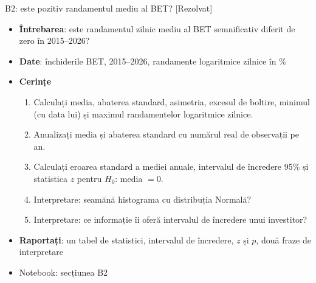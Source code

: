 \begin{frame}{B2: este pozitiv randamentul mediu al BET? [Rezolvat]}
\itemsize{\footnotesize}
\begin{itemize}
\item \textbf{Întrebarea}: este randamentul zilnic mediu al BET semnificativ diferit de zero în 2015--2026?
\item \textbf{Date}: închiderile BET, 2015--2026, randamente logaritmice zilnice în \%
\item \textbf{Cerințe}
\begin{enumerate}
    \item Calculați media, abaterea standard, asimetria, excesul de boltire, minimul (cu data lui) și maximul randamentelor logaritmice zilnice.
    \item Anualizați media și abaterea standard cu numărul real de observații pe an.
    \item Calculați eroarea standard a mediei anuale, intervalul de încredere 95\% și statistica $z$ pentru $H_0$: media $= 0$.
    \item Interpretare: seamănă histograma cu distribuția Normală?
    \item Interpretare: ce informație îi oferă intervalul de încredere unui investitor?
\end{enumerate}
\item \textbf{Raportați}: un tabel de statistici, intervalul de încredere, $z$ și $p$, două fraze de interpretare
\item Notebook: secțiunea B2
\end{itemize}
\end{frame}

